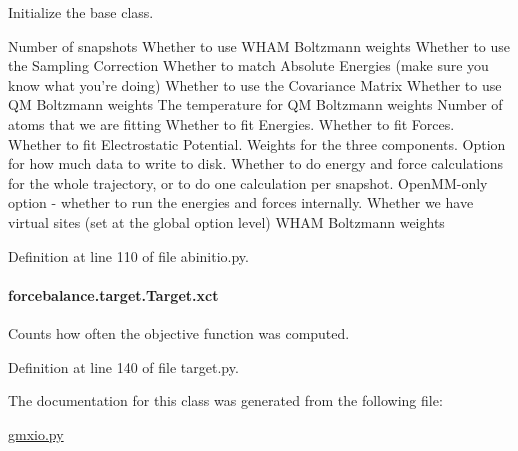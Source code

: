 Initialize the base class. 

Number of snapshots Whether to use W\-H\-A\-M Boltzmann weights Whether to use the Sampling Correction Whether to match Absolute Energies (make sure you know what you're doing) Whether to use the Covariance Matrix Whether to use Q\-M Boltzmann weights The temperature for Q\-M Boltzmann weights Number of atoms that we are fitting Whether to fit Energies. Whether to fit Forces. Whether to fit Electrostatic Potential. Weights for the three components. Option for how much data to write to disk. Whether to do energy and force calculations for the whole trajectory, or to do one calculation per snapshot. Open\-M\-M-\/only option -\/ whether to run the energies and forces internally. Whether we have virtual sites (set at the global option level) W\-H\-A\-M Boltzmann weights 

Definition at line 110 of file abinitio.\-py.

\hypertarget{classforcebalance_1_1target_1_1Target_aad2e385cfbf7b4a68f1c2cb41133fe82}{
\paragraph[{xct}]{\setlength{\rightskip}{0pt plus 5cm}forcebalance.\-target.\-Target.\-xct\hspace{0.3cm}{\ttfamily [inherited]}}}\label{classforcebalance_1_1target_1_1Target_aad2e385cfbf7b4a68f1c2cb41133fe82}


Counts how often the objective function was computed. 



Definition at line 140 of file target.\-py.



The documentation for this class was generated from the following file\-:\begin{DoxyCompactItemize}
\item 
\hyperlink{gmxio_8py}{gmxio.\-py}\end{DoxyCompactItemize}

